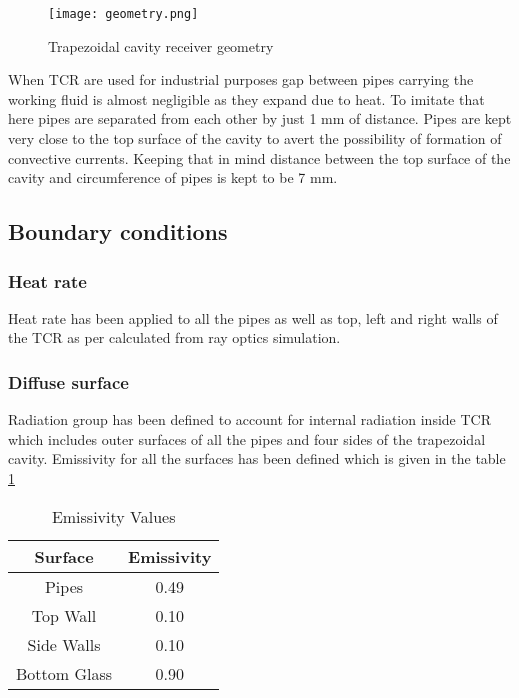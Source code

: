 \begin{figure}[H]
\begin{center}
\texttt{[image: geometry.png]}
\caption{Trapezoidal cavity receiver geometry}
\label{fig:tcrgeo}
\end{center}
\end{figure}


When TCR are used for industrial purposes gap between pipes carrying the working fluid is almost negligible as they expand due to heat. To imitate that here pipes are separated from each other by just 1 mm of distance. Pipes are kept very close to the top surface of the cavity to avert the possibility of formation of convective currents. Keeping that in mind distance between the top surface of the cavity and circumference of pipes is kept to be 7 mm. 


\subsection{Boundary conditions}
\subsubsection{Heat rate}
Heat rate has been applied to all the pipes as well as top, left and right walls of the TCR as per calculated from ray optics simulation.
\subsubsection{Diffuse surface}
Radiation group has been defined to account for internal radiation inside TCR which includes outer surfaces of all the pipes and four sides of the trapezoidal cavity. Emissivity for all the surfaces has been defined which is given in the table \ref{tab:eValues}

\begin{table}[H]
\centering
\caption{Emissivity Values}
\label{tab:eValues}
\begin{tabular}{@{}|c|c|@{}}
\toprule
\textbf{Surface} & \textbf{Emissivity\citep{SAHOO201384}} \\ \midrule
Pipes            & 0.49                \\ \midrule
Top Wall         & 0.10                 \\ \midrule
Side Walls       & 0.10                 \\ \midrule
Bottom Glass      & 0.90                 \\ \bottomrule
\end{tabular}
\end{table}

